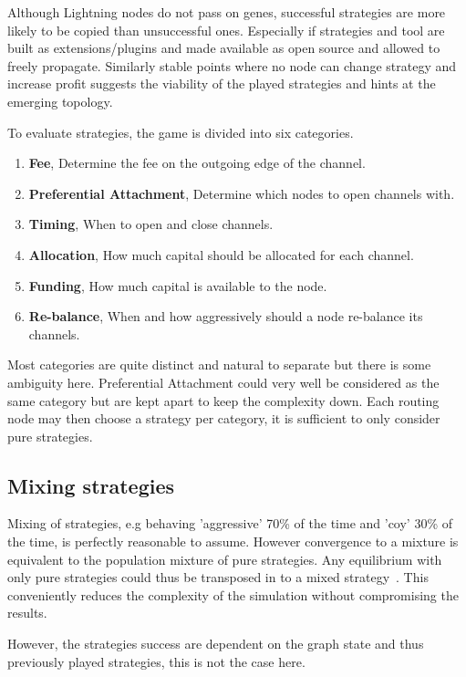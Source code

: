 Although Lightning nodes do not pass on genes, successful strategies are more likely to be copied than unsuccessful ones. Especially if strategies and tool are built as extensions/plugins and made available as open source and allowed to freely propagate. Similarly stable points where no \gls{node} can change strategy and increase profit suggests the viability of the played strategies and hints at the emerging topology. 

To evaluate strategies, the game is divided into six categories.

\begin{enumerate}
	\item \textbf{Fee}, Determine the fee on the outgoing edge of the channel.
	\item \textbf{Preferential Attachment}, Determine which nodes to open channels with.
	\item \textbf{Timing}, When to open and close channels.
	\item \textbf{Allocation}, How much capital should be allocated for each channel.
	\item \textbf{Funding}, How much capital is available to the node.
	\item \textbf{Re-balance}, When and how aggressively should a node re-balance its channels. 
\end{enumerate}

Most categories are quite distinct and natural to separate but there is some ambiguity here. Preferential Attachment could very well be considered as the same category but are kept apart to keep the complexity down. Each routing \gls{node} may then choose a strategy per category, it is sufficient to only consider pure strategies. 

\subsection{Mixing strategies}

Mixing of strategies, e.g behaving 'aggressive' 70\% of the time and 'coy' 30\% of the time, is perfectly reasonable to assume. However convergence to a mixture is equivalent to the population mixture of pure strategies. Any equilibrium with only pure strategies could thus be transposed in to a mixed strategy~\cite{easly:kleinberg:network:crowds:markets}. This conveniently reduces the complexity of the simulation without compromising the results. 

However, the strategies success are dependent on the graph state and thus previously played strategies, this is not the case here. 

